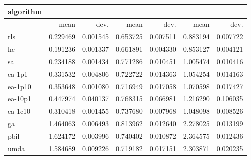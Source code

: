 \begin{tabular}{@{}l*{6}{>{{}}N{1}{2}}@{}}
\toprule
{algorithm} &  &  &  \\
\midrule
& {mean} & {dev.} & {mean} & {dev.} & {mean} & {dev.} \\
\midrule
rls & 0.229469 & 0.001545 & 0.653725 & 0.007511 & 0.883194 & 0.007722 \\
 hc & 0.191236 & 0.001337 & 0.661891 & 0.004330 & 0.853127 & 0.004121 \\
 sa & 0.234188 & 0.001434 & 0.771286 & 0.010451 & 1.005474 & 0.010416 \\
 ea-1p1 & 0.331532 & 0.004806 & 0.722722 & 0.014363 & 1.054254 & 0.014163 \\
 ea-1p10 & 0.353648 & 0.001080 & 0.716949 & 0.017058 & 1.070598 & 0.017427 \\
 ea-10p1 & 0.447974 & 0.040137 & 0.768315 & 0.066981 & 1.216290 & 0.106035 \\
 ea-1c10 & 0.310418 & 0.001455 & 0.737680 & 0.007968 & 1.048098 & 0.008526 \\
 ga & 1.464063 & 0.006493 & 0.813962 & 0.012640 & 2.278025 & 0.013199 \\
 pbil & 1.624172 & 0.003996 & 0.740402 & 0.010872 & 2.364575 & 0.012436 \\
 umda & 1.584689 & 0.009226 & 0.719182 & 0.017151 & 2.303871 & 0.020235 \\
 \bottomrule
\end{tabular}
